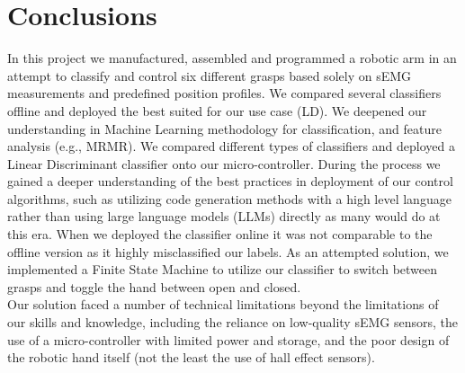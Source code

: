 \documentclass[10pt]{article}
\begin{document}
\section{Conclusions}
In this project we manufactured, assembled and programmed a robotic arm in an attempt to classify and control six different grasps based solely on sEMG measurements and predefined position profiles. We compared several classifiers offline and deployed the best suited for our use case (LD). We deepened our understanding in Machine Learning methodology for classification, and feature analysis (e.g., MRMR). We compared different types of classifiers and deployed a Linear Discriminant classifier onto our micro-controller. During the process we gained a deeper understanding of the best practices in deployment of our control algorithms, such as utilizing code generation methods with a high level language rather than using large language models (LLMs) directly as many would do at this era. When we deployed the classifier online it was not comparable to the offline version as it highly misclassified our labels. As an attempted solution, we implemented a Finite State Machine to utilize our classifier to switch between grasps and toggle the hand between open and closed.\\
Our solution faced a number of technical limitations beyond the limitations of our skills and knowledge, including the reliance on low-quality sEMG sensors, the use of a micro-controller with limited power and storage, and the poor design of the robotic hand itself (not the least the use of hall effect sensors).




\end{document}
